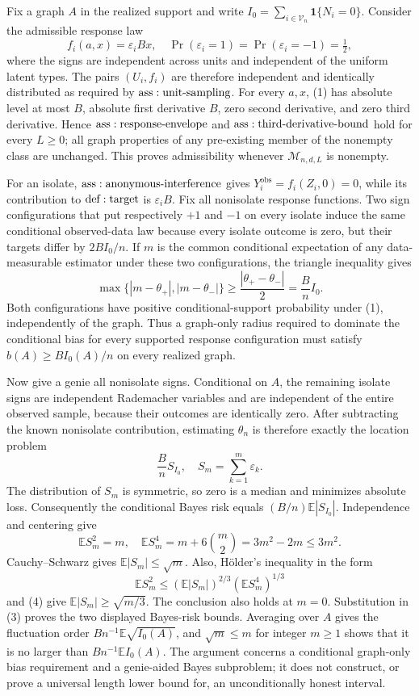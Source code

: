 Fix a graph \(A\) in the realized support and write \(I_0=\sum_{i\in\mathcal V_n}\mathbf1\{N_i=0\}\).  Consider the admissible response law
\[
 f_i(a,x)=\varepsilon_iBx,
 \quad \Pr(\varepsilon_i=1)=\Pr(\varepsilon_i=-1)=\tfrac12,
\tag{1}
\]
where the signs are independent across units and independent of the uniform latent types.  The pairs \((U_i,f_i)\) are therefore independent and identically distributed as required by \({\rm ass:unit\text{-}sampling}\).  For every \(a,x\), (1) has absolute level at most \(B\), absolute first derivative \(B\), zero second derivative, and zero third derivative.  Hence \({\rm ass:response\text{-}envelope}\) and \({\rm ass:third\text{-}derivative\text{-}bound}\) hold for every \(L\geq0\); all graph properties of any pre-existing member of the nonempty class are unchanged.  This proves admissibility whenever \(\mathcal M_{n,d,L}\) is nonempty.

For an isolate, \({\rm ass:anonymous\text{-}interference}\) gives \(Y_i^{\mathrm{obs}}=f_i(Z_i,0)=0\), while its contribution to \({\rm def:target}\) is \(\varepsilon_iB\).  Fix all nonisolate response functions.  Two sign configurations that put respectively \(+1\) and \(-1\) on every isolate induce the same conditional observed-data law because every isolate outcome is zero, but their targets differ by \(2BI_0/n\).  If \(m\) is the common conditional expectation of any data-measurable estimator under these two configurations, the triangle inequality gives
\[
 \max\{|m-\theta_+|,|m-\theta_-|\}
 \geq\frac{|\theta_+-\theta_-|}{2}=\frac Bn I_0.
\tag{2}
\]
Both configurations have positive conditional-support probability under (1), independently of the graph.  Thus a graph-only radius required to dominate the conditional bias for every supported response configuration must satisfy \(b(A)\geq BI_0(A)/n\) on every realized graph.

Now give a genie all nonisolate signs.  Conditional on \(A\), the remaining isolate signs are independent Rademacher variables and are independent of the entire observed sample, because their outcomes are identically zero.  After subtracting the known nonisolate contribution, estimating \(\theta_n\) is therefore exactly the location problem
\[
 \frac Bn S_{I_0},\quad S_m=\sum_{k=1}^m\varepsilon_k.
\tag{3}
\]
The distribution of \(S_m\) is symmetric, so zero is a median and minimizes absolute loss.  Consequently the conditional Bayes risk equals \((B/n)\mathbb E|S_{I_0}|\).  Independence and centering give
\[
 \mathbb ES_m^2=m,\quad
 \mathbb ES_m^4=m+6\binom m2=3m^2-2m\leq3m^2.
\tag{4}
\]
Cauchy--Schwarz gives \(\mathbb E|S_m|\leq\sqrt m\).  Also, Hölder's inequality in the form
\[
 \mathbb ES_m^2
 \leq(\mathbb E|S_m|)^{2/3}(\mathbb ES_m^4)^{1/3}
\]
and (4) give \(\mathbb E|S_m|\geq\sqrt{m/3}\).  The conclusion also holds at \(m=0\).  Substitution in (3) proves the two displayed Bayes-risk bounds.  Averaging over \(A\) gives the fluctuation order \(Bn^{-1}\mathbb E\sqrt{I_0(A)}\), and \(\sqrt m\leq m\) for integer \(m\geq1\) shows that it is no larger than \(Bn^{-1}\mathbb EI_0(A)\).  The argument concerns a conditional graph-only bias requirement and a genie-aided Bayes subproblem; it does not construct, or prove a universal length lower bound for, an unconditionally honest interval.